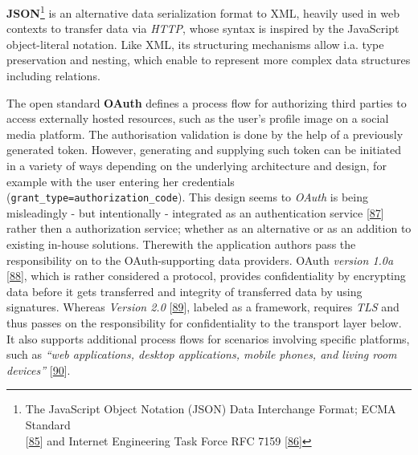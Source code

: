 \documentclass[12pt,english,a4paper,titlepage,cleardoublepage=empty,dottedtoc]{report}
\begin{document}
\textbf{JSON}\footnote{The JavaScript Object Notation (JSON) Data
  Interchange Format; ECMA Standard\\
  {[}\protect\hyperlink{ref-web_spec_json}{85}{]} and Internet
  Engineering Task Force RFC 7159
  {[}\protect\hyperlink{ref-web_rfc_json}{86}{]}} is an alternative data
serialization format to XML, heavily used in web contexts to transfer
data via \emph{HTTP}, whose syntax is inspired by the JavaScript
object-literal notation. Like XML, its structuring mechanisms allow i.a.
type preservation and nesting, which enable to represent more complex
data structures including relations.

The open standard \textbf{\protect\hypertarget{def--oauth}{}{OAuth}}
defines a process flow for authorizing third parties to access
externally hosted resources, such as the user's profile image on a
social media platform. The authorisation validation is done by the help
of a previously generated token. However, generating and supplying such
token can be initiated in a variety of ways depending on the underlying
architecture and design, for example with the user entering her
credentials (\texttt{grant\_type=authorization\_code}). This design
seems to \emph{OAuth} is being misleadingly - but intentionally -
integrated as an authentication service
{[}\protect\hyperlink{ref-web_2012_problem-with-oauth-for-authentication}{87}{]}
rather then a authorization service; whether as an alternative or as an
addition to existing in-house solutions. Therewith the application
authors pass the responsibility on to the OAuth-supporting data
providers. OAuth \emph{version 1.0a}
{[}\protect\hyperlink{ref-web_spec_oauth-1a}{88}{]}, which is rather
considered a protocol, provides confidentiality by encrypting data
before it gets transferred and integrity of transferred data by using
signatures. Whereas \emph{Version 2.0}
{[}\protect\hyperlink{ref-web_spec_oauth-2}{89}{]}, labeled as a
framework, requires \emph{TLS} and thus passes on the responsibility for
confidentiality to the transport layer below. It also supports
additional process flows for scenarios involving specific platforms,
such as \emph{``web applications, desktop applications, mobile phones,
and living room devices''}
{[}\protect\hyperlink{ref-web_2016_oauth-2}{90}{]}.
\end{document}
